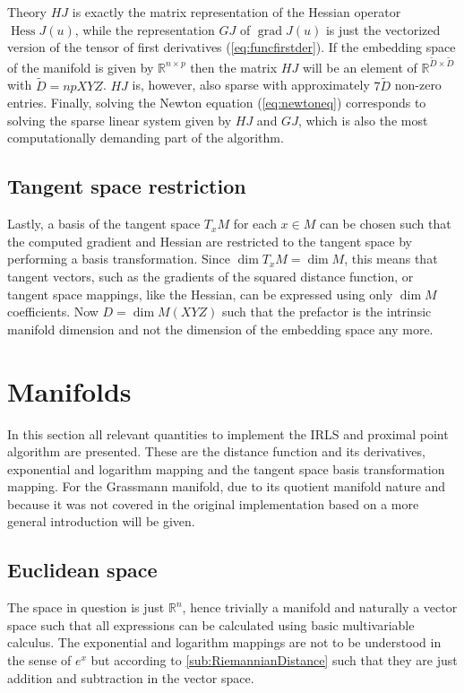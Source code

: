 \begin{chapter}{Theory}
$HJ$ is exactly the matrix representation of the Hessian operator $\operatorname{Hess}J(u)$, while the representation $GJ$ of $\operatorname{grad}J(u)$ is just the vectorized version
of the tensor of first derivatives (\ref{eq:funcfirstder}). If the embedding space of the manifold is given by $\mathbb{R}^{n\times p}$ then the matrix $HJ$
will be an element of $\mathbb{R}^{\tilde D\times\tilde D}$ with $\tilde D=npXYZ$. $HJ$ is, however, also sparse with approximately $7\tilde D$ non-zero entries.
Finally, solving the Newton equation (\ref{eq:newtoneq}) corresponds to solving the sparse linear system given by $HJ$ and $GJ$, which is also the most computationally demanding
part of the algorithm.

\subsection{Tangent space restriction} %
\label{sub:Tangent space restriction}
Lastly, a basis of the tangent space $T_xM$ for each $x\in M$ can be chosen such that the computed gradient and Hessian are restricted to the tangent space by performing a basis transformation. Since $\operatorname{dim}T_xM=\operatorname{dim} M$, this means that tangent vectors, such as the gradients 
of the squared distance function, or tangent space mappings, like the Hessian, can be expressed using only $\operatorname{dim} M$ coefficients. Now $D=\operatorname{dim}M (XYZ)$ such that the prefactor is the intrinsic manifold dimension and not the dimension of the embedding space any more.



\section{Manifolds} %
\label{sec:Manifolds}
In this section all relevant quantities to implement the IRLS and proximal point algorithm are presented. These are the distance function and its derivatives,
exponential and logarithm mapping and the tangent space basis transformation mapping. 
For the Grassmann manifold, due to its quotient manifold nature and because it was not covered in the original implementation based on \cite{SprecherIRLS}
a more general introduction will be given.

\subsection{Euclidean space} %
\label{sub:Euclidian}
The space in question is just $\mathbb{R}^n$, hence trivially a manifold and naturally a vector space such that all expressions can be calculated using basic
multivariable calculus. The exponential and logarithm mappings are not to be understood in the sense of $e^x$ but according to \ref{sub:RiemannianDistance} such that
they are just addition and subtraction in the vector space.


\end{chapter}
